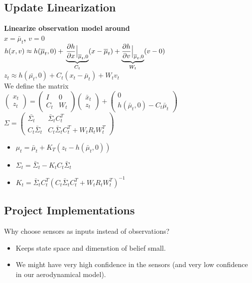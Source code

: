 \subsection*{Update Linearization}
\textbf{Linearize observation model around\\
$x = \bar{\mu}_t$, $v=0$}\\
$h(x, v) \approx h(\bar{\mu}_t, 0) + \\
\underbrace{\dfrac{\partial h}{\partial x}\Bigr|_{\substack{\bar{\mu}_t,
0}}}_{C_t}(x - \bar{\mu}_t) +
\underbrace{\dfrac{\partial h}{\partial v}\Bigr|_{\substack{\bar{\mu}_t,
0}}}_{W_t}(v - 0)$\\
$z_t \approx h(\bar{\mu_t}, 0) + C_t (x_t - \bar{\mu}_t) + W_t  v_t$\\
We define the matrix\\
$
\begin{pmatrix}
  x_t \\ z_t
\end{pmatrix} =
\begin{pmatrix}
  I & 0\\C_t & W_t
\end{pmatrix}
\begin{pmatrix}
  \bar{x}_t \\ z_t
\end{pmatrix} +
\begin{pmatrix}
  0 \\ h(\bar{\mu}_t, 0) - C_t \bar{\mu}_t
\end{pmatrix}
$
$
\Sigma =
\begin{pmatrix}
  \bar{\Sigma_t} & \bar{\Sigma}_t C_t^T\\
  C_t \bar{\Sigma}_t & C_t \bar{\Sigma}_t C_t^T + W_t R_t W_t^T
\end{pmatrix}
$

\begin{itemize}
  \item $\mu_t = \bar{\mu}_t + K_T(z_t - h(\bar{\mu}_t, 0))$
  \item $\Sigma_t = \bar{\Sigma}_t - K_t C_t \bar{\Sigma}_t$
  \item $K_t = \bar{\Sigma}_t C_t^T (C_t \bar{\Sigma}_t C_t^T + W_t R_t
    W_t^T)^{-1}$
\end{itemize}

\subsection*{Project Implementations}
Why choose sensors as inputs instead of observations?
\begin{itemize}
  \item Keeps state space and dimenstion of belief small.
  \item We might have very high confidence in the sensors (and very low
    confidence in our aerodynamical model).
\end{itemize}

